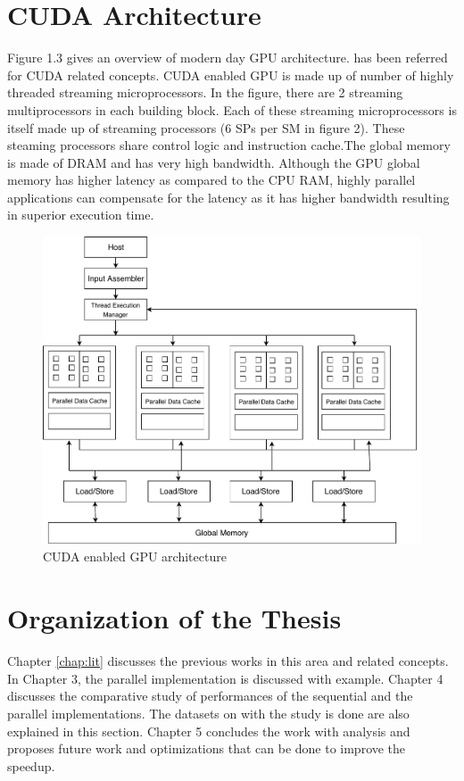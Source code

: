 \section{CUDA Architecture}

Figure 1.3 gives an overview of modern day GPU architecture. \cite{book} has been referred for CUDA related concepts. CUDA enabled GPU is made up of number of highly threaded streaming microprocessors. In the figure, there are 2 streaming multiprocessors in each building block. Each of these streaming microprocessors is itself made up of streaming processors (6 SPs per SM in figure 2). These steaming processors share control logic and instruction cache.The global memory is made of DRAM and has very high bandwidth. Although the GPU global memory has higher latency as compared to the CPU RAM, highly parallel applications can compensate for the latency as it has higher bandwidth resulting in superior execution time.

\begin{figure}[h]
\centering 
\includegraphics[width=\columnwidth]{images/gpu.pdf} 
\caption[CUDA architecture]{CUDA enabled GPU architecture} %
\label{fig:gallery} 
\end{figure}

\section{Organization of the Thesis}
Chapter \ref{chap:lit} discusses the previous works in this area and related concepts. In Chapter 3, the parallel implementation is discussed with example. Chapter 4 discusses the comparative study of performances of the sequential and the parallel implementations. The datasets on with the study is done are also explained in this section. Chapter 5 concludes the work with analysis and proposes future work and optimizations that can be done to improve the speedup.